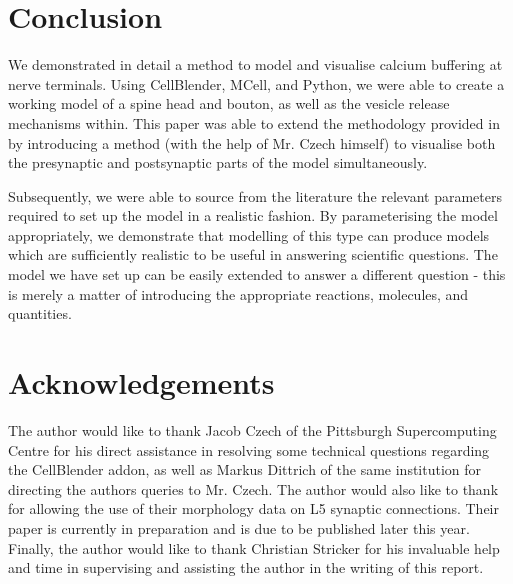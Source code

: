 \documentclass[a4paper]{article}
\begin{document}
\section{Conclusion}
We demonstrated in detail a method to model and visualise calcium buffering at nerve terminals. Using CellBlender, MCell, and Python, we were able to create a working model of a spine head and bouton, as well as the vesicle release mechanisms within. This paper was able to extend the methodology provided in \cite{Czech:MethodsMolBiol:2009} by introducing a method (with the help of Mr. Czech himself) to visualise both the presynaptic and postsynaptic parts of the model simultaneously.

Subsequently, we were able to source from the literature the relevant parameters required to set up the model in a realistic fashion. By parameterising the model appropriately, we demonstrate that modelling of this type can produce models which are sufficiently realistic to be useful in answering scientific questions. The model we have set up can be easily extended to answer a different question - this is merely a matter of introducing the appropriate reactions, molecules, and quantities.

\section{Acknowledgements}
The author would like to thank Jacob Czech of the Pittsburgh Supercomputing Centre for his direct assistance in resolving some technical questions regarding the CellBlender addon, as well as Markus Dittrich of the same institution for directing the authors queries to Mr. Czech. The author would also like to thank \cite{Rollehagen::2015} for allowing the use of their morphology data on L5 synaptic connections. Their paper is currently in preparation and is due to be published later this year. Finally, the author would like to thank Christian Stricker for his invaluable help and time in supervising and assisting the author in the writing of this report.

{}

\end{document}
